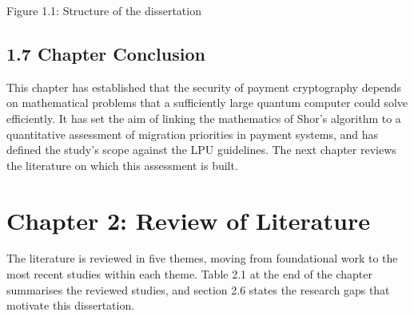 \documentclass[12pt,oneside]{report}
\begin{document}
\begin{center}
\end{center}
\label{fig:1.1}Figure 1.1: Structure of the dissertation
\par

\subsection*{1.7 Chapter Conclusion}

This chapter has established that the security of payment cryptography depends on mathematical problems that a sufficiently large quantum computer could solve efficiently. It has set the aim of linking the mathematics of Shor's algorithm to a quantitative assessment of migration priorities in payment systems, and has defined the study's scope against the LPU guidelines. The next chapter reviews the literature on which this assessment is built.
\par

\newpage
\section*{Chapter 2: Review of Literature}

The literature is reviewed in five themes, moving from foundational work to the most recent studies within each theme. Table 2.1 at the end of the chapter summarises the reviewed studies, and section 2.6 states the research gaps that motivate this dissertation.
\par
\end{document}
